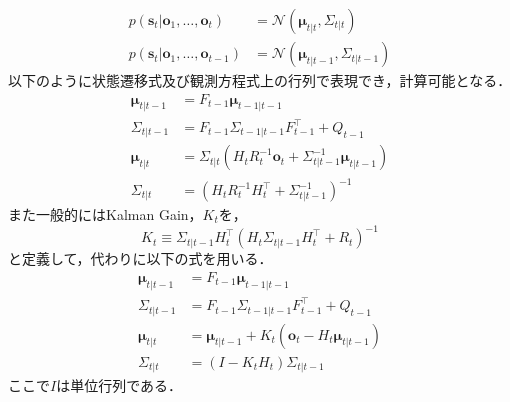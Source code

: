         \begin{equation}
            \label{eq:normal_format}
            \begin{aligned}
                p(\left. \bm{s}_t \right| \bm{o}_1,\dots, \bm{o}_t ) &= \mathcal{N}(\bm{\mu}_{t|t}, \Sigma_{t|t})
                \\ p(\left.\bm{s}_t\right| \bm{o}_1,\dots, \bm{o}_{t-1}) &= \mathcal{N}(\bm{\mu}_{t|t-1}, \Sigma_{t|t-1})
            \end{aligned}
        \end{equation}
        以下のように状態遷移式及び観測方程式上の行列で表現でき，計算可能となる．
        \begin{equation}
            \begin{aligned}
                \bm{\mu}_{t|t-1} &= F_{t-1} \bm{\mu}_{t-1|t-1}
                \\\Sigma_{t|t-1} &= F_{t-1} \Sigma_{t-1|t-1} F_{t-1}^{\top} + Q_{t-1}
                \\\bm{\mu}_{t|t} &= \Sigma_{t|t} \left( H_t R_t^{-1} \bm{o}_t + \Sigma_{t|t-1}^{-1} \bm{\mu}_{t|t-1} \right)
                \\\Sigma_{t|t} &= \left( H_t R_t^{-1} H_t^{\top} + \Sigma_{t|t-1}^{-1}\right)^{-1}
            \end{aligned}                    
        \end{equation}
        また一般的にはKalman Gain，$K_t$を，
        \begin{equation}
            \label{eq:kalman_gain}
            K_t \equiv \Sigma_{t|t-1}H_t^{\top} \left( H_t\Sigma_{t|t-1}H_t^{\top} + R_t\right)^{-1}
        \end{equation}
        と定義して，代わりに以下の式を用いる．
        \begin{equation}
            \label{eq:kalman_equations}
            \begin{aligned}
                \bm{\mu}_{t|t-1} &= F_{t-1} \bm{\mu}_{t-1|t-1}
                \\\Sigma_{t|t-1} &= F_{t-1} \Sigma_{t-1|t-1} F_{t-1}^{\top} + Q_{t-1}
                \\\bm{\mu}_{t|t} &= \bm{\mu}_{t|t-1} + K_t \left(\bm{o}_t - H_t \bm{\mu}_{t|t-1}\right)
                \\\Sigma_{t|t} &= (I - K_t H_t) \Sigma_{t|t-1}
            \end{aligned}                    
        \end{equation}
        ここで$I$は単位行列である．

